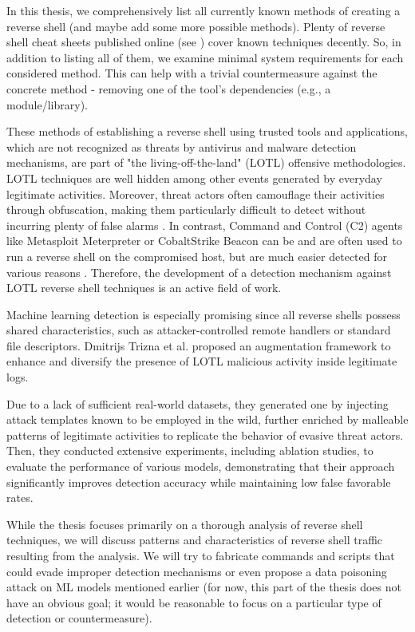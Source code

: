 In this thesis, we comprehensively list all currently known methods of creating a reverse shell (and maybe add some more possible methods). Plenty of reverse shell cheat sheets published online (see \cite{cheatsheet1, cheatsheet2, cheatsheet3}) cover known techniques decently. So, in addition to listing all of them, we examine minimal system requirements for each considered method. This can help with a trivial countermeasure against the concrete method - removing one of the tool's dependencies (e.g., a module/library).

These methods of establishing a reverse shell using trusted tools and applications, which are not recognized as threats by antivirus and malware detection mechanisms, are part of "the living-off-the-land" (LOTL) offensive methodologies. LOTL techniques are well hidden among other events generated by everyday legitimate activities. Moreover, threat actors often camouflage their activities through obfuscation, making them particularly difficult to detect without incurring plenty of false alarms \cite{LOTL_def}. In contrast, Command and Control (C2) agents like Metasploit Meterpreter \cite{metasploit} or CobaltStrike Beacon \cite{cobaltstrike} can be and are often used to run a reverse shell on the compromised host, but are much easier detected for various reasons \cite{LOTL}. Therefore, the development of a detection mechanism against LOTL reverse shell techniques is an active field of work.

Machine learning detection is especially promising since all reverse shells possess shared characteristics, such as attacker-controlled remote handlers or standard file descriptors. Dmitrijs Trizna et al. proposed an augmentation framework \cite{LOTL} to enhance and diversify the presence of LOTL malicious activity inside legitimate logs.

Due to a lack of sufficient real-world datasets, they generated one by injecting attack templates known to be employed in the wild, further enriched by malleable patterns of legitimate activities to replicate the behavior of evasive threat actors. Then, they conducted extensive experiments, including ablation studies, to evaluate the performance of various models, demonstrating that their approach significantly improves detection accuracy while maintaining low false favorable rates.

While the thesis focuses primarily on a thorough analysis of reverse shell techniques, we will discuss patterns and characteristics of reverse shell traffic resulting from the analysis. We will try to fabricate commands and scripts that could evade improper detection mechanisms or even propose a data poisoning attack on ML models mentioned earlier (for now, this part of the thesis does not have an obvious goal; it would be reasonable to focus on a particular type of detection or countermeasure).

